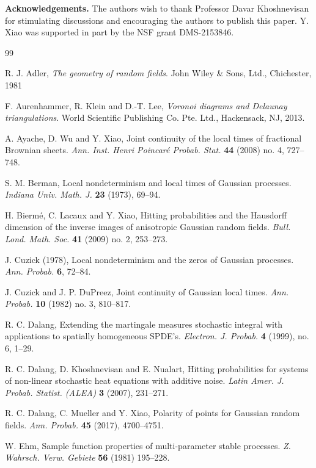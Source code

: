 \documentclass[11pt, reqno]{amsart}
\numberwithin{equation}{section}
\begin{document}
\medskip

{\bf Acknowledgements.} 
The authors wish to thank Professor Davar Khoshnevisan for stimulating discussions and encouraging the authors to publish this paper.
Y. Xiao was supported in part by the NSF grant DMS-2153846.

\begin{thebibliography}{99}

R. J. Adler, {\it The geometry of random fields}. John Wiley \& Sons, Ltd., Chichester, 1981

F. Aurenhammer, R. Klein and D.-T. Lee, {\it Voronoi diagrams and Delaunay triangulations}. World Scientific Publishing 
Co. Pte. Ltd., Hackensack, NJ, 2013.

A. Ayache, D. Wu and Y. Xiao, Joint continuity of the local times of fractional Brownian sheets. {\it Ann. Inst. 
Henri Poincar\'e Probab. Stat.} {\bf 44} (2008) no. 4, 727--748.

S. M. Berman, Local nondeterminism and local times of Gaussian processes.
{\it Indiana Univ. Math. J.} {\bf 23} (1973), 69--94.

H. Bierm\'e, C. Lacaux and Y. Xiao, Hitting probabilities and the Hausdorff dimension
of the inverse images of anisotropic Gaussian random fields. {\it Bull. Lond. Math. Soc.} {\bf 41} (2009) no. 2, 253--273.

J. Cuzick (1978), Local nondeterminism and the zeros of Gaussian
processes. {\it Ann. Probab.} {\bf 6},  72--84.

J. Cuzick and J. P. DuPreez, Joint continuity of Gaussian local times. {\it Ann. Probab.} {\bf 10} (1982) no. 3, 810--817.

R. C. Dalang, Extending the martingale measures stochastic integral
 with applications to spatially homogeneous SPDE's. {\it Electron. J. Probab.} {\bf 4} (1999), no. 6, 1--29.

R. C. Dalang, D. Khoshnevisan and E. Nualart, Hitting probabilities for systems of
non-linear stochastic heat equations with additive noise.  \textit{Latin Amer. J. Probab.
Statist. (ALEA)} \textbf{3} (2007), 231--271.

R. C. Dalang, C. Mueller and Y. Xiao, Polarity of points for Gaussian random fields.
{\it Ann. Probab.} {\bf 45} (2017), %
4700--4751.

W. Ehm, Sample function properties of multi-parameter stable processes. {\it Z. Wahrsch. Verw. Gebiete} 
{\bf 56} (1981) 195--228.


\end{thebibliography}
\end{document}
